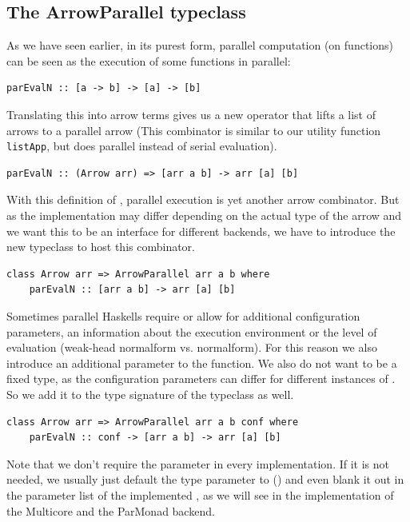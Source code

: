 \subsection{The ArrowParallel typeclass}
As we have seen earlier, in its purest form, parallel computation (on functions) can be seen as the execution of some functions  in parallel:
\begin{lstlisting}[frame=htrbl]
parEvalN :: [a -> b] -> [a] -> [b]
\end{lstlisting}
Translating this into arrow terms gives us a new operator  that lifts a list of arrows \code{[arr a b]} to a parallel arrow  (This combinator is similar to our utility function \lstinline{listApp}, but does parallel instead of serial evaluation).
\begin{lstlisting}[frame=htrbl]
parEvalN :: (Arrow arr) => [arr a b] -> arr [a] [b]
\end{lstlisting}
With this definition of , parallel execution is yet another arrow combinator. But as the implementation may differ depending on the actual type of the arrow  and we want this to be an interface for different backends, we have to introduce the new typeclass  to host this combinator.
\begin{lstlisting}[frame=htrbl]
class Arrow arr => ArrowParallel arr a b where
	parEvalN :: [arr a b] -> arr [a] [b]
\end{lstlisting}
Sometimes parallel Haskells require or allow for additional configuration parameters, \eg an information about the execution environment or the level of evaluation (weak-head normalform vs. normalform). For this reason we also introduce an additional  parameter to the function. We also do not want  to be a fixed type, as the configuration parameters can differ for different instances of . So we add it to the type signature of the typeclass as well.
\begin{lstlisting}[frame=htrbl]
class Arrow arr => ArrowParallel arr a b conf where
	parEvalN :: conf -> [arr a b] -> arr [a] [b]
\end{lstlisting}
Note that we don't require the  parameter in every implementation. If it is not needed, we usually just default the  type parameter to () and even blank it out in the parameter list of the implemented , as we will see in the implementation of the Multicore and the ParMonad backend.

